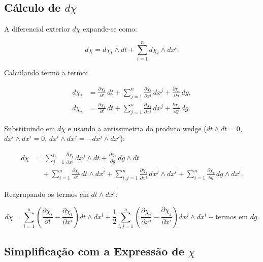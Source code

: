 \subsection{C\'alculo de $d\chi$}

A diferencial exterior $d\chi$ expande-se como:

\begin{equation}
d\chi = d\chi_t \wedge dt + \sum_{i=1}^n d\chi_i \wedge dx^i.
\end{equation}

\noindent Calculando termo a termo:

\begin{align}
d\chi_t &= \frac{\partial \chi_t}{\partial t}\,dt + \sum_{j=1}^n \frac{\partial \chi_t}{\partial x^j}\,dx^j + \frac{\partial \chi_t}{\partial g}\,dg, \\
d\chi_i &= \frac{\partial \chi_i}{\partial t}\,dt + \sum_{j=1}^n \frac{\partial \chi_i}{\partial x^j}\,dx^j + \frac{\partial \chi_i}{\partial g}\,dg.
\end{align}

\noindent Substituindo em $d\chi$ e usando a antissimetria do produto wedge ($dt \wedge dt = 0$, $dx^i \wedge dx^i = 0$, $dx^i \wedge dx^j = -dx^j \wedge dx^i$):

\begin{align}
d\chi &= \sum_{j=1}^n \frac{\partial \chi_t}{\partial x^j}\,dx^j \wedge dt + \frac{\partial \chi_t}{\partial g}\,dg \wedge dt \nonumber\\
&\quad + \sum_{i=1}^n \frac{\partial \chi_i}{\partial t}\,dt \wedge dx^i + \sum_{i,j=1}^n \frac{\partial \chi_i}{\partial x^j}\,dx^j \wedge dx^i + \sum_{i=1}^n \frac{\partial \chi_i}{\partial g}\,dg \wedge dx^i.
\end{align}

\noindent Reagrupando os termos em $dt \wedge dx^i$:

\begin{equation}
d\chi = \sum_{i=1}^n \left(\frac{\partial \chi_i}{\partial t} - \frac{\partial \chi_t}{\partial x^i}\right) dt \wedge dx^i + \frac{1}{2}\sum_{i,j=1}^n \left(\frac{\partial \chi_i}{\partial x^j} - \frac{\partial \chi_j}{\partial x^i}\right) dx^j \wedge dx^i + \text{termos em } dg.
\end{equation}

\subsection{Simplifica\c{c}\~ao com a Express\~ao de $\chi$}

